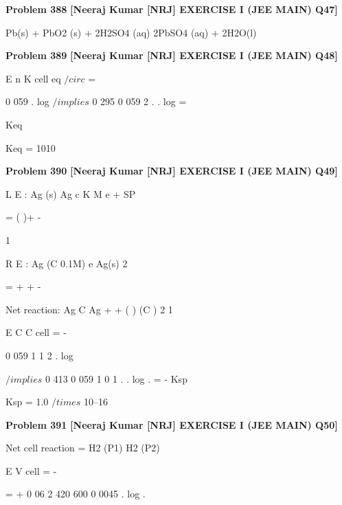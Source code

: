 \begin{problembox}
\textbf{Problem 388} \hfill \textbf{[Neeraj Kumar [NRJ] EXERCISE I (JEE MAIN) Q47]}
\label{q:ext-nrj_all_questions-388}

Pb(s) + PbO2 (s) + 2H2SO4 (aq) 
 2PbSO4 
(aq) + 2H2O(l)
\end{problembox}

\begin{problembox}
\textbf{Problem 389} \hfill \textbf{[Neeraj Kumar [NRJ] EXERCISE I (JEE MAIN) Q48]}
\label{q:ext-nrj_all_questions-389}

E
n
K
cell
eq
$/circ$
=
 
0 059
.
log
 $/implies$ 0 295
0 059
2
.
.
log
=
 
Keq
 
   Keq = 1010
\end{problembox}

\begin{problembox}
\textbf{Problem 390} \hfill \textbf{[Neeraj Kumar [NRJ] EXERCISE I (JEE MAIN) Q49]}
\label{q:ext-nrj_all_questions-390}

L E : Ag (s)
Ag
c
K
M
e
+
SP
 
=
(
)+
-

  


 



1
 
 
R E : Ag
(C
0.1M)
e
Ag(s)
2
 
=
+
+
-
  


 



 
   Net reaction: Ag
C
Ag
+
+
(
)
(C )
2
1

  


 



 
 
E
C
C
cell = -
 
0 059
1
1
2
.
log
 
 
 $/implies$ 0 413
0 059
1
0 1
.
.
log
.
= -
Ksp
 
   Ksp = 1.0 $/times$ 10--16
\end{problembox}

\begin{problembox}
\textbf{Problem 391} \hfill \textbf{[Neeraj Kumar [NRJ] EXERCISE I (JEE MAIN) Q50]}
\label{q:ext-nrj_all_questions-391}

Net cell reaction = H2 (P1) 
 H2 (P2)
 
 
E
V
cell = -
 
= +
0 06
2
420
600
0 0045
.
log
.
\end{problembox}


